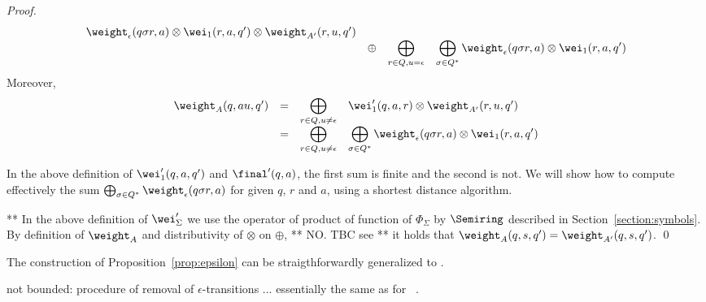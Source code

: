 \begin{proof}
\[\begin{array}{lccl}
  \weight_\epsilon(q\sigma r, a) \otimes  \wei_1(r, a, q') \otimes \weight_{A'}(r, u, q')\\
 & \oplus & \displaystyle\bigoplus_{r \in Q, u = \epsilon} &
   \displaystyle\bigoplus_{\sigma \in Q^*} \weight_\epsilon(q\sigma r, a) \otimes \wei_{1}(r, a, q')  
\end{array}
\]
Moreover, %
\[
\begin{array}{lccl}
\weight_{A}(q, au, q') & = & 
    \displaystyle\bigoplus_{r \in Q, u \neq \epsilon} &
    \wei'_{1}(q, a, r) \otimes \weight_{A'}(r, u, q')\\
 & = & \displaystyle\bigoplus_{r \in Q, u \neq \epsilon} & 
  \displaystyle\bigoplus_{\sigma \in Q^*} 
  \weight_\epsilon(q\sigma r, a) \otimes  \wei_1(r, a, q')
\end{array}
\]






In the above definition of $\wei'_1(q, a, q')$ and $\final'(q, a)$, 
the first sum is finite and the second is not. 
%
We will show how to compute effectively the sum 
$\bigoplus_{\sigma \in Q^*} \weight_\epsilon(q\sigma r, a)$
for given $q$, $r$ and $a$, 
using a shortest distance algorithm.


** In the above definition of $\wei'_\Sigma$ we use the operator
of product of function of $\Phi_\Sigma$ by $\Semiring$ 
described in Section~\ref{section:symbols}.
%
By definition of $\weight_{A}$ and distributivity of $\otimes$ on $\oplus$, 
** NO. TBC see \cite{Mohri02ijfcs} **
it holds that $\weight_{A}(q, s, q') = \weight_{A'}(q, s, q')$.
\qed
\end{proof}     

The construction of Proposition~\ref{prop:epsilon} 
can be straigthforwardly generalized to \SWT.

not bounded: 
procedure of removal of $\epsilon$-transitions
... essentially the same as for \WA~\cite{Mohri02ijfcs}.
